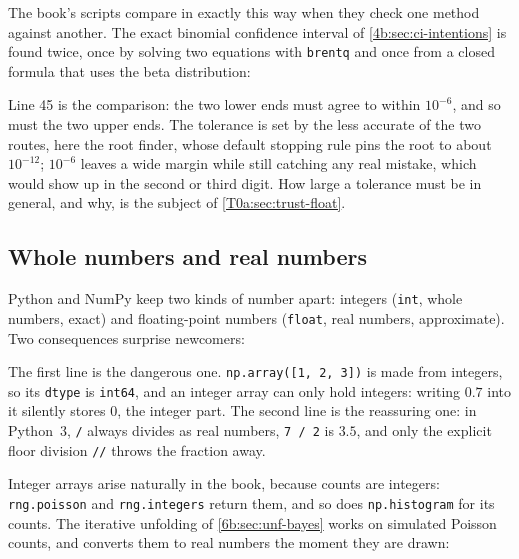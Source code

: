 The book's scripts compare in exactly this way when they check one method against another. The exact binomial confidence interval of \cref{4b:sec:ci-intentions} is found twice, once by solving two equations with \texttt{brentq} and once from a closed formula that uses the beta distribution:


Line 45 is the comparison: the two lower ends must agree to within $10^{-6}$, and so must the two upper ends. The tolerance is set by the less accurate of the two routes, here the root finder, whose default stopping rule pins the root to about $10^{-12}$; $10^{-6}$ leaves a wide margin while still catching any real mistake, which would show up in the second or third digit. How large a tolerance must be in general, and why, is the subject of \cref{T0a:sec:trust-float}.

\subsection{Whole numbers and real numbers}
\label{T0a:sec:pit-int}

Python and NumPy keep two kinds of number apart: integers (\texttt{int}, whole numbers, exact) and floating-point numbers (\texttt{float}, real numbers, approximate). Two consequences surprise newcomers:


The first line is the dangerous one. \texttt{np.array([1, 2, 3])} is made from integers, so its \texttt{dtype} is \texttt{int64}, and an integer array can only hold integers: writing $0.7$ into it silently stores $0$, the integer part. The second line is the reassuring one: in Python~3, \texttt{/} always divides as real numbers, \texttt{7 / 2} is $3.5$, and only the explicit floor division \texttt{//} throws the fraction away.

Integer arrays arise naturally in the book, because counts are integers: \texttt{rng.poisson} and \texttt{rng.integers} return them, and so does \texttt{np.histogram} for its counts. The iterative unfolding of \cref{6b:sec:unf-bayes} works on simulated Poisson counts, and converts them to real numbers the moment they are drawn:


